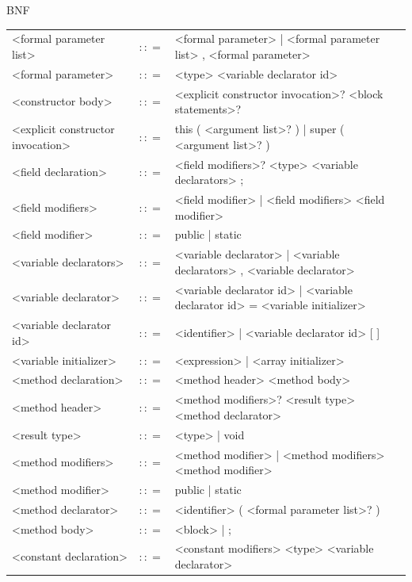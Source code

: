 \documentclass[landscape, 11pt]{article}
\begin{document}
\begin{qsection}{BNF}
\begin{enumerate}[label=\bt{\theenumi.}]
\begin{longtable}{R{7cm} c L{15cm}}
				\\
				<formal parameter list>						&	$\colon\colon=$	&	<formal parameter> | <formal parameter list> , <formal parameter>
				\\
				<formal parameter>							&	$\colon\colon=$	&	<type> <variable declarator id>
				\\
				<constructor body>							&	$\colon\colon=$	&	{ <explicit constructor invocation>? <block statements>? }
				\\
				<explicit constructor invocation>			&	$\colon\colon=$	&	this ( <argument list>? ) | super ( <argument list>? )
				\\
				<field declaration>							&	$\colon\colon=$	&	<field modifiers>? <type> <variable declarators> ;
				\\
				<field modifiers>							&	$\colon\colon=$	&	<field modifier> | <field modifiers> <field modifier>
				\\
				<field modifier>							&	$\colon\colon=$	&	public | static
				\\
				<variable declarators>						&	$\colon\colon=$	&	<variable declarator> | <variable declarators> , <variable declarator>
				\\
				<variable declarator>						&	$\colon\colon=$	&	<variable declarator id> | <variable declarator id> = <variable initializer>
				\\
				<variable declarator id>					&	$\colon\colon=$	&	<identifier> | <variable declarator id> [ ]
				\\
				<variable initializer>						&	$\colon\colon=$	&	<expression> | <array initializer>
				\\
				<method declaration>						&	$\colon\colon=$	&	<method header> <method body>
				\\
				<method header>								&	$\colon\colon=$	&	<method modifiers>? <result type> <method declarator>
				\\
				<result type>								&	$\colon\colon=$	&	<type> | void
				\\
				<method modifiers>							&	$\colon\colon=$	&	<method modifier> | <method modifiers> <method modifier>
				\\
				<method modifier>							&	$\colon\colon=$	&	public | static
				\\
				<method declarator>							&	$\colon\colon=$	&	<identifier> ( <formal parameter list>? )
				\\
				<method body>								&	$\colon\colon=$	&	<block> | ;
				\\
				<constant declaration>						&	$\colon\colon=$	&	<constant modifiers> <type> <variable declarator>

\end{longtable}
\end{enumerate}
\end{qsection}
\end{document}
